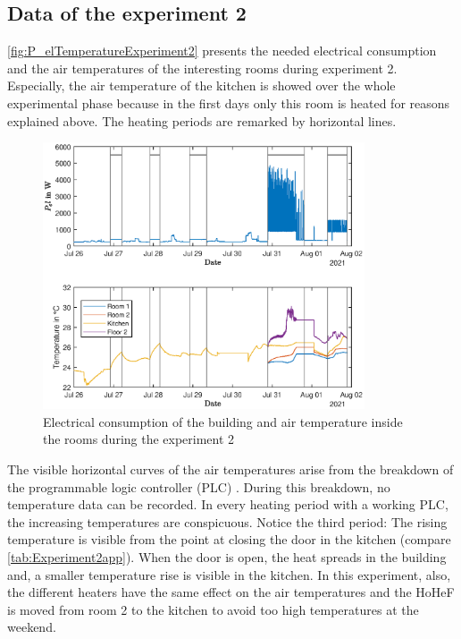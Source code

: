 \subsection{Data of the experiment 2}
\label{subsec:Data of the experiment 2}
\autoref{fig:P_elTemperatureExperiment2} presents the needed electrical consumption and the air temperatures of the interesting rooms during experiment 2. Especially, the air temperature of the kitchen is showed over the whole experimental phase because in the first days only this room is heated for reasons explained above. The heating periods are remarked by horizontal lines.
    \begin{figure}[h]
            \centering
            \includegraphics[width=0.85\textwidth]{figure/Trainingsdaten_P_el_und_Raumtemperaturen_latex.eps}
           \caption{Electrical consumption of the building and air temperature inside the rooms during the experiment 2}
           \label{fig:P_elTemperatureExperiment2}
    \end{figure}
The visible horizontal curves of the air temperatures arise from the breakdown of the programmable logic controller (PLC) . During this breakdown, no temperature data can be recorded. In every heating period with a working PLC, the increasing temperatures are conspicuous. Notice the third period: The rising temperature is visible from the point at closing the door in the kitchen (compare \autoref{tab:Experiment2app}). When the door is open, the heat spreads in the building and, a smaller temperature rise is visible in the kitchen.  In this experiment, also, the different heaters have the same effect on the air temperatures and the HoHeF is moved from room 2 to the kitchen to avoid too high temperatures at the weekend.

